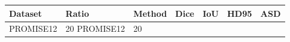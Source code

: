 \begin{tabular}{lllllll}
\toprule
Dataset & Ratio & Method & Dice & IoU & HD95 & ASD \\
\midrule
PROMISE12 & 20%
PROMISE12 & 20%
\bottomrule
\end{tabular}
